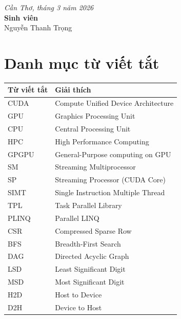 \documentclass[12pt,a4paper]{report}
\begin{document}
\vspace{1cm}
\begin{flushright}
    \textit{Cần Thơ, tháng 3 năm 2026}\\[0.5cm]
    \textbf{Sinh viên}\\[1cm]
    Nguyễn Thanh Trọng
\end{flushright}

\tableofcontents
\newpage

\listoffigures
{}
\newpage

\listoftables
{}
\newpage

\chapter*{Danh mục từ viết tắt}

\begin{longtable}{@{}ll@{}}
\toprule
\textbf{Từ viết tắt} & \textbf{Giải thích} \\
\midrule
\endhead
CUDA & Compute Unified Device Architecture \\
GPU & Graphics Processing Unit \\
CPU & Central Processing Unit \\
HPC & High Performance Computing \\
GPGPU & General-Purpose computing on GPU \\
SM & Streaming Multiprocessor \\
SP & Streaming Processor (CUDA Core) \\
SIMT & Single Instruction Multiple Thread \\
TPL & Task Parallel Library \\
PLINQ & Parallel LINQ \\
CSR & Compressed Sparse Row \\
BFS & Breadth-First Search \\
DAG & Directed Acyclic Graph \\
LSD & Least Significant Digit \\
MSD & Most Significant Digit \\
H2D & Host to Device \\
D2H & Device to Host \\
\bottomrule
\end{longtable}
\end{document}
